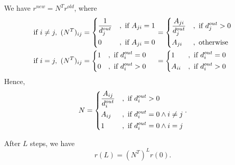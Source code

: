 We have \(r^{new} = N^{T} r^{old}\), where
\[
	\begin{alignedat}{3}
		&\text{if }i\neq  j,\ (N^{T})_{ij} = \begin{dcases}
			\frac{1}{d_{j}^{out}} & , \text{ if } A_{ji} = 1 \\
			0                     & , \text{ if } A_{ji} = 0 \\
		\end{dcases} &&= \begin{dcases}
			\frac{A_{ji}}{d_{j}^{out}} & , \text{ if }d_{j}^{out}>0 \\
			A_{ji}                     & , \text{ otherwise}        \\
		\end{dcases}\\
		&\text{if }i = j,\ (N^{T})_{ij} = \begin{dcases}
			1 & , \text{ if } d_{i}^{out} = 0 \\
			0 & , \text{ if } d_{i}^{out} > 0 \\
		\end{dcases} &&= \begin{dcases}
			1      & , \text{ if } d_{i}^{out} = 0 \\
			A_{ii} & , \text{ if } d_{i}^{out} > 0 \\
		\end{dcases}
	\end{alignedat}
\]
Hence,
\[
	N = \begin{dcases}
		\frac{A_{ij}}{d_{i}^{out}} & , \text{ if } d_{i}^{out}>0                \\
		A_{ij}                     & , \text{ if }d_{i}^{out} = 0 \land i\neq j \\
		1                          & , \text{ if }d_{i}^{out} = 0 \land i= j    \\
	\end{dcases}.
\]

After \(L\) steps, we have
\[
	r(L) = (N^{T})^L r(0).
\]


